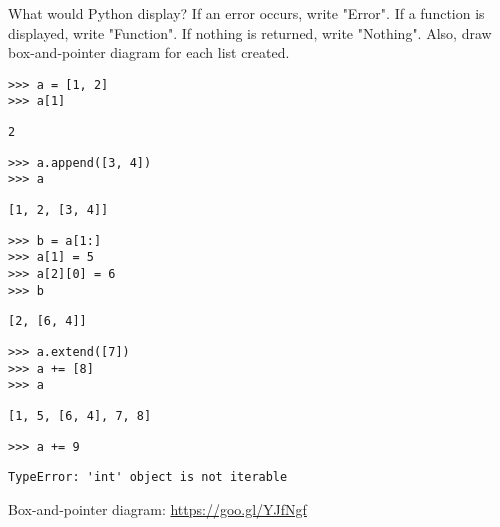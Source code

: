 \begin{blocksection}
\question What would Python display? If an error occurs, write "Error". If a function is displayed, write "Function". If nothing is returned, write "Nothing". Also, draw box-and-pointer diagram for each list created.

\begin{lstlisting}
>>> a = [1, 2]
>>> a[1]
\end{lstlisting}
\begin{solution}[0.25in]
\begin{lstlisting}
2
\end{lstlisting}
\end{solution}
\begin{lstlisting}
>>> a.append([3, 4])
>>> a
\end{lstlisting}
\begin{solution}[0.25in]
\begin{lstlisting}
[1, 2, [3, 4]]
\end{lstlisting}
\end{solution}
\end{blocksection}

\begin{lstlisting}
>>> b = a[1:]
>>> a[1] = 5
>>> a[2][0] = 6
>>> b
\end{lstlisting}
\begin{solution}[0.25in]
\begin{lstlisting}
[2, [6, 4]]
\end{lstlisting}
\end{solution}

\begin{lstlisting}
>>> a.extend([7])
>>> a += [8]
>>> a
\end{lstlisting}

\begin{solution}[0.25in]
\begin{lstlisting}
[1, 5, [6, 4], 7, 8]
\end{lstlisting}
\end{solution}

\begin{lstlisting}
>>> a += 9
\end{lstlisting}
\begin{solution}[0.25in]
\begin{lstlisting}
TypeError: 'int' object is not iterable
\end{lstlisting}
\end{solution}

\begin{solution}
Box-and-pointer diagram: 
\url{https://goo.gl/YJfNgf}
\end{solution}

